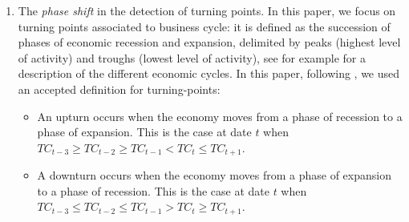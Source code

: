 \documentclass[
]{article}
\providecommand{\tightlist}{%
  \setlength{\itemsep}{0pt}\setlength{\parskip}{0pt}}\usepackage{longtable,booktabs,array}
\newcommand\1{\mathds{1}}
\begin{document}
\begin{enumerate}
\def\labelenumi{\arabic{enumi}.}
\item
  The \emph{phase shift} in the detection of turning points. In this
  paper, we focus on turning points associated to business cycle: it is
  defined as the succession of phases of economic recession and
  expansion, delimited by peaks (highest level of activity) and troughs
  (lowest level of activity), see for example \textcite{ferrara} for a
  description of the different economic cycles. In this paper, following
  \textcite{Zellner1991}, we used an accepted definition for
  turning-points:

  \begin{itemize}
  \tightlist
  \item
    An upturn occurs when the economy moves from a phase of recession to
    a phase of expansion. This is the case at date \(t\) when
    \(TC_{t-3}\geq TC_{t-2}\geq TC_{t-1}<TC_t\leq TC_{t+1}\).\\
  \item
    A downturn occurs when the economy moves from a phase of expansion
    to a phase of recession. This is the case at date \(t\) when
    \(TC_{t-3}\leq TC_{t-2}\leq TC_{t-1}>TC_t\geq TC_{t+1}\).
  \end{itemize}


\end{enumerate}
\end{document}
